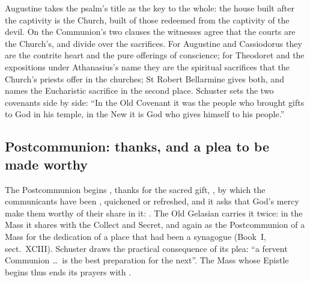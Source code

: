 Augustine takes the psalm's title as the key to the whole: the house built
after the captivity is the Church, built of those redeemed from the captivity
of the devil. On the Communion's two clauses the witnesses agree that the
courts are the Church's, and divide over the sacrifices. For Augustine and
Cassiodorus they are the contrite heart and the pure offerings of conscience;
for Theodoret and the expositions under Athanasius's name they are the
spiritual sacrifices that the Church's priests offer in the churches; St
Robert Bellarmine gives both, and names the Eucharistic sacrifice in the
second place. Schuster sets the two covenants side by side: ``In the Old
Covenant it was the people who brought gifts to God in his temple, in the New
it is God who gives himself to his people.''

\subsection{Postcommunion: thanks, and a plea to be made worthy}

The Postcommunion begins , thanks for the sacred
gift, , by which the communicants have been
, quickened or refreshed, and it asks that God's mercy make
them worthy of their share in it: . The Old Gelasian carries it twice: in the Mass it shares with the
Collect and Secret, and again as the Postcommunion of a Mass for the dedication
of a place that had been a synagogue (Book~I, sect.~XCIII). Schuster draws the
practical consequence of its plea: ``a fervent Communion \dots\ is the best
preparation for the next''. The Mass whose Epistle begins 
thus ends its prayers with .
